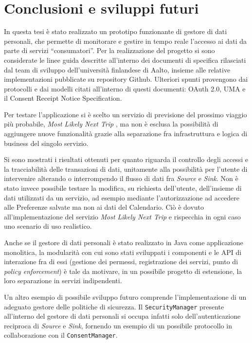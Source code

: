 \chapter{Conclusioni e sviluppi futuri}
\label{capitolo6}
\thispagestyle{empty}

\noindent In questa tesi \`e stato realizzato un prototipo funzionante di gestore di dati personali, che permette di monitorare e gestire in tempo reale l’accesso ai dati da parte di servizi “consumatori”. Per la realizzazione del progetto si sono considerate le linee guida descritte all’interno dei documenti di specifica rilasciati dal team di sviluppo dell’universit\`a finlandese di Aalto, insieme alle relative implementazioni pubblicate su repository Github. Ulteriori spunti provengono dai protocolli e dai modelli citati all’interno di questi documenti: OAuth 2.0, UMA e il Consent Receipt Notice Specification.

Per testare l’applicazione si \`e scelto un servizio di previsione del prossimo viaggio pi\`u probabile, \textit{Most Likely Next Trip} \cite{MLNT}, ma non \`e esclusa la possibilit\`a di aggiungere nuove funzionalit\`a grazie alla separazione fra infrastruttura e logica di business del singolo servizio.

Si sono mostrati i risultati ottenuti per quanto riguarda il controllo degli accessi e la tracciabilit\`a delle transazioni di dati, unitamente alla possibilit\`a per l’utente di intervenire alterando o interrompendo il flusso di dati fra \textit{Source} e \textit{Sink}. Non \`e stato invece possibile testare la modifica, su richiesta dell’utente, dell’insieme di dati utilizzati da un servizio, ad esempio mediante l’autorizzazione ad accedere alle Preferenze salvate ma non ai dati del Calendario. Ci\`o \`e dovuto all’implementazione del servizio \textit{Most Likely Next Trip} e rispecchia in ogni caso uno scenario di uso realistico.

Anche se il gestore di dati personali \`e stato realizzato in Java come applicazione monolitica, la modularit\`a con cui sono stati sviluppati i componenti e le API di interazione fra di essi (gestione dei permessi, registrazione dei servizi, punto di \textit{policy enforcement}) \`e tale da motivare, in un possibile progetto di estensione, la loro separazione in servizi indipendenti.

Un altro esempio di possibile sviluppo futuro comprende l’implementazione di un adeguato gestore delle politiche di sicurezza. Il \texttt{SecurityManager} presente all’interno del gestore di dati personali si occupa infatti solo dell’autenticazione reciproca di \textit{Source} e \textit{Sink}, fornendo un esempio di un possibile protocollo in collaborazione con il \texttt{ConsentManager}.

